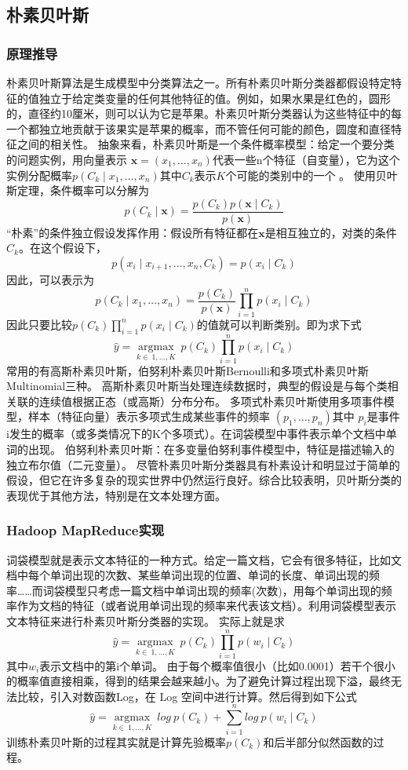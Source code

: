 \documentclass[lang=cn,11pt]{elegantpaper}
\begin{document}
\subsection{朴素贝叶斯}
\subsubsection{原理推导}
朴素贝叶斯算法是生成模型中分类算法之一。所有朴素贝叶斯分类器都假设特定特征的值独立于给定类变量的任何其他特征的值。例如，如果水果是红色的，圆形的，直径约10厘米，则可以认为它是苹果。朴素贝叶斯分类器认为这些特征中的每一个都独立地贡献于该果实是苹果的概率，而不管任何可能的颜色，圆度和直径特征之间的相关性。
抽象来看，朴素贝叶斯是一个条件概率模型：给定一个要分类的问题实例，用向量表示 $ \mathbf {x} =(x_ {1} , \dots, x_ {n})$代表一些n个特征（自变量），它为这个实例分配概率$p(C_ {k} \mid x_ {1}, \dots, x_ {n})$其中$C_{k}$表示$K$个可能的类别中的一个 。
使用贝叶斯定理，条件概率可以分解为
$$p(C_ {k} \mid \mathbf {x})= {\frac {p(C_ {k})p (\mathbf {x} \mid C_ {k})} {p(\mathbf {x} )}}$$
“朴素”的条件独立假设发挥作用：假设所有特征都在$\mathbf {x}$是相互独立的，对类的条件$ C_ {k}$。在这个假设下，
$$p(x_ {i}\mid x_ {i+1},\dots,x_ {n},C_ {k})= p(x_ {i} \mid C_ {k})$$
因此，可以表示为
$$p(C_ {k} \mid x_ {1},\dots,x_ {n})= \frac{p(C_ {k})}{p(\mathbf {x})}\prod_ {i = 1}^{n} p(x_ {i} \mid C_ {k})$$
因此只要比较$p(C_ {k})\prod_ {i = 1}^{n} p(x_ {i} \mid C_ {k})$的值就可以判断类别。即为求下式
$$\hat{y} = {\underset {k \in \ {1,\dots,K}} {\operatorname {argmax}}} \ p(C_ {k})\prod_{i = 1} ^ {n} p(x_ {i} \mid C_ {k})$$
常用的有高斯朴素贝叶斯，伯努利朴素贝叶斯Bernoulli和多项式朴素贝叶斯Multinomial三种。
高斯朴素贝叶斯当处理连续数据时，典型的假设是与每个类相关联的连续值根据正态（或高斯）分布分布。
多项式朴素贝叶斯使用多项事件模型，样本（特征向量）表示多项式生成某些事件的频率 $(p_ {1},\dots,p_ {n})$其中 $p_i$是事件i发生的概率（或多类情况下的K个多项式）。在词袋模型中事件表示单个文档中单词的出现。
伯努利朴素贝叶斯：在多变量伯努利事件模型中，特征是描述输入的独立布尔值（二元变量）。
尽管朴素贝叶斯分类器具有朴素设计和明显过于简单的假设，但它在许多复杂的现实世界中仍然运行良好。综合比较表明，贝叶斯分类的表现优于其他方法，特别是在文本处理方面。
\subsubsection{Hadoop MapReduce实现}
词袋模型就是表示文本特征的一种方式。给定一篇文档，它会有很多特征，比如文档中每个单词出现的次数、某些单词出现的位置、单词的长度、单词出现的频率……而词袋模型只考虑一篇文档中单词出现的频率(次数)，用每个单词出现的频率作为文档的特征（或者说用单词出现的频率来代表该文档）。利用词袋模型表示文本特征来进行朴素贝叶斯分类器的实现。
实际上就是求
$$\hat{y} = {\underset {k \in \ {1,\dots,K}} {\operatorname {argmax}}} \ p(C_ {k})\prod_{i = 1} ^ {n} p(w_ {i} \mid C_ {k})$$
其中$w_i$表示文档中的第i个单词。
由于每个概率值很小（比如0.0001）若干个很小的概率值直接相乘，得到的结果会越来越小。为了避免计算过程出现下溢，最终无法比较，引入对数函数Log，在 Log 空间中进行计算。然后得到如下公式
$$\hat{y} = {\underset {k \in \ {1,\dots,K}} {\operatorname {argmax}}} \ log \ p(C_ {k}) + \sum_{i = 1} ^ {n} log \ p(w_ {i} \mid C_ {k})$$
训练朴素贝叶斯的过程其实就是计算先验概率$p(C_k)​$和后半部分似然函数的过程。
\end{document}
